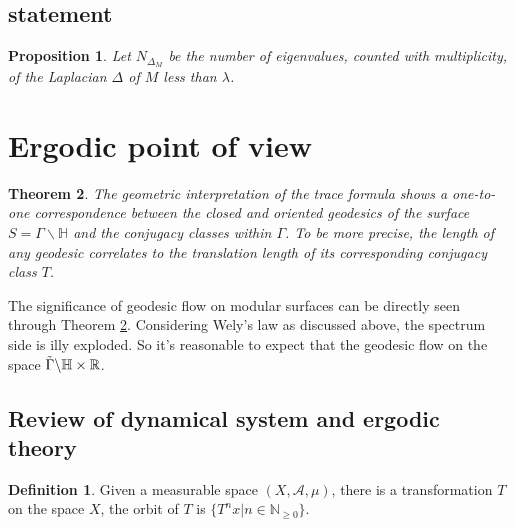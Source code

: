 \documentclass[12pt,a4paper,english]{article}
\theoremstyle{plain}
\newtheorem{thm}{Theorem}[section]
\newtheorem{prop}[thm]{Proposition}
\theoremstyle{definition}
\newtheorem{defi}{Definition}
\theoremstyle{remark}
\begin{document}
\subsection{statement}
\begin{prop}
Let $N_{\Delta_{M}}$ be the number of eigenvalues, counted with multiplicity, of the Laplacian $\Delta$ of $M$ less than $\lambda$.   
\end{prop}

\section{Ergodic point of view}

\begin{thm}\label{geodesictoconjugacy}
   The geometric interpretation of the trace formula shows a one-to-one correspondence between the closed and oriented geodesics of the surface $S=\Gamma\backslash \mathbb{H}$ and the conjugacy classes within $\Gamma$. To be more precise, the length of any geodesic correlates to the translation length of its corresponding conjugacy class ${T}$. 
\end{thm}

The significance of geodesic flow on modular surfaces can be directly seen through Theorem \ref{geodesictoconjugacy}. Considering Wely's law as discussed above, the spectrum side is illy exploded. So it's reasonable to expect that the geodesic flow on the space $\Tilde{\Gamma}\backslash \mathbb{H}\times \mathbb{R}$.

\subsection{Review of dynamical system and ergodic theory}

\begin{defi}
    Given a measurable space $(X,\mathcal{A},\mu)$, there is a transformation $T$ on the space $X$, the orbit of $T$ is $\{T^{n}x|n\in\mathbb{N}_{\geq0}\}$.
\end{defi}

\newpage


\end{document}
